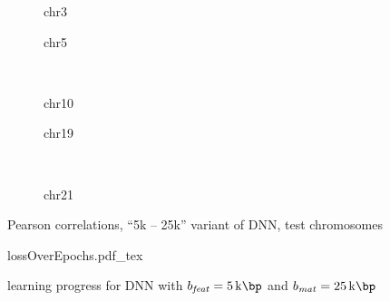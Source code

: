 \begin{figure}[p]
    \begin{subfigure}{0.45\textwidth}
        \scriptsize
        \caption{chr3}
    \end{subfigure} \hfill
    \begin{subfigure}{0.45\textwidth}
        \scriptsize
        \caption{chr5}
    \end{subfigure}\\[5mm]
    \begin{subfigure}{0.45\textwidth}
        \scriptsize
        \caption{chr10}
    \end{subfigure}\hfill
    \begin{subfigure}{0.45\textwidth}
        \scriptsize
        \caption{chr19}
    \end{subfigure}\\[3mm]
    \centering
    \begin{subfigure}{0.45\textwidth}
        \scriptsize
        \caption{chr21}
    \end{subfigure}
    \caption{Pearson correlations, ``5k -- 25k'' variant of DNN,  test chromosomes}
    \label{fig:results:25k5DNN_pearson}
\end{figure}
\begin{figure}[hbp]
 \centering
 \scriptsize
 {lossOverEpochs.pdf_tex}
 \caption{learning progress for DNN with $b_\mathit{feat}=\SI{5}{\kilo\bp}$ and $b_\mathit{mat}=\SI{25}{\kilo\bp}$} \label{fig:results:25k5DNN_lossEpochs}
\end{figure}

